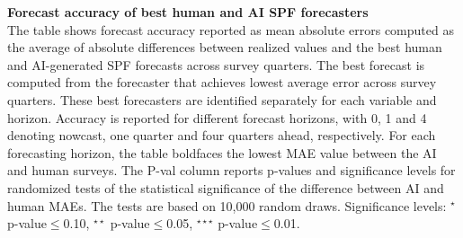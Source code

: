 \documentclass[11pt,letterpaper]{scrartcl}
\begin{document}

\begin{table}[h!]
    \centering
    \footnotesize{
    
    }
    \caption{
    \textbf{Forecast accuracy of best human and AI SPF forecasters}
    \vspace{10pt}\\
    \footnotesize{The table shows forecast accuracy reported as mean absolute errors computed as the average of absolute differences between realized values and the best human and AI-generated SPF forecasts across survey quarters. The best forecast is computed from the forecaster that achieves lowest average error across survey quarters. These best forecasters are identified separately for each variable and horizon. Accuracy is reported for different forecast horizons, with 0, 1 and 4 denoting nowcast, one quarter and four quarters ahead, respectively. For each forecasting horizon, the table boldfaces the lowest MAE value between the AI and human surveys. The P-val column reports p-values and significance levels for randomized tests of the statistical significance of the difference between AI and human MAEs. The tests are based on 10,000 random draws. Significance levels: $^{\star}$ p-value$\leq$0.10, $^{\star\star}$ p-value$\leq$0.05, $^{\star\star\star}$ p-value$\leq$0.01.
}}
    \label{tab:forecastaccacy_AI_SPF_best}
\end{table}
\clearpage

\end{document}
